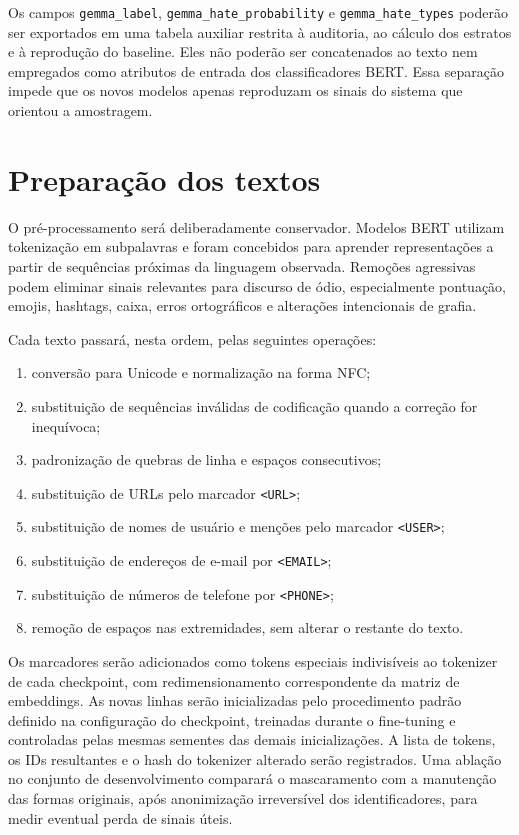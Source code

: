 Os campos \texttt{gemma\_label}, \texttt{gemma\_hate\_probability} e
\texttt{gemma\_hate\_types} poderão ser exportados em uma tabela auxiliar
restrita à auditoria, ao cálculo dos estratos e à reprodução do baseline. Eles
não poderão ser concatenados ao texto nem empregados como atributos de entrada
dos classificadores BERT. Essa separação impede que os novos modelos apenas
reproduzam os sinais do sistema que orientou a amostragem.

\section{Preparação dos textos}
\label{sec:preparacao-textos}

O pré-processamento será deliberadamente conservador. Modelos BERT utilizam
tokenização em subpalavras e foram concebidos para aprender representações a
partir de sequências próximas da linguagem observada. Remoções agressivas podem
eliminar sinais relevantes para discurso de ódio, especialmente pontuação,
emojis, hashtags, caixa, erros ortográficos e alterações intencionais de
grafia.

Cada texto passará, nesta ordem, pelas seguintes operações:

\begin{enumerate}
    \item conversão para Unicode e normalização na forma NFC;
    \item substituição de sequências inválidas de codificação quando a correção
    for inequívoca;
    \item padronização de quebras de linha e espaços consecutivos;
    \item substituição de URLs pelo marcador \texttt{<URL>};
    \item substituição de nomes de usuário e menções pelo marcador
    \texttt{<USER>};
    \item substituição de endereços de e-mail por \texttt{<EMAIL>};
    \item substituição de números de telefone por \texttt{<PHONE>};
    \item remoção de espaços nas extremidades, sem alterar o restante do texto.
\end{enumerate}

Os marcadores serão adicionados como tokens especiais indivisíveis ao tokenizer
de cada checkpoint, com redimensionamento correspondente da matriz de embeddings.
As novas linhas serão inicializadas pelo procedimento padrão definido na
configuração do checkpoint, treinadas durante o fine-tuning e controladas pelas
mesmas sementes das demais inicializações. A lista de tokens, os IDs resultantes
e o hash do tokenizer alterado serão registrados. Uma ablação no conjunto de
desenvolvimento comparará o mascaramento com a manutenção das formas originais,
após anonimização irreversível dos identificadores, para medir eventual perda de
sinais úteis.

